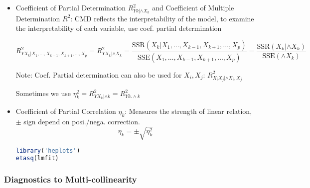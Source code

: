 \begin{itemize}[topsep=2pt,itemsep=2pt]
\item Coefficient of Partial Determination $ R^2_{Yk|\wedge X_k} $ and Coefficient of Multiple Determination $ R^2 $:
    CMD reflects the interpretability of the model, to examine the interpretability of each variable, use coef. partial determination

\begin{equation}
    R^2_{YX_k|X_1,\ldots,X_{k-1},X_{k+1},\ldots,X_p}=R^2_{YX_k|\wedge X_k}=\dfrac{\mathrm{SSR}(X_k|X_1,\ldots,X_{k-1},X_{k+1},\ldots,X_p) }{\mathrm{SSE}(X_1,\ldots,X_{k-1},X_{k+1},\ldots,X_p) }=\dfrac{\mathrm{SSR}(X_k|\wedge X_k) }{\mathrm{SSE}(\wedge X_k) }
\end{equation}

    Note: Coef. Partial determination can also be used for $ X_i,X_j $: $ R^2_{X_iX_j|\wedge X_i,X_j} $

    Sometimes we use $ \eta^2_k=R^2_{YX_k|\wedge k}=R^2_{Yk.\wedge k} $

    \item Coefficient of Partial Correlation $ \eta_k $: Measures the strength of linear relation, $ \pm $ sign depend on posi./nega. correction.
    \begin{equation}
        \eta_k=\pm \sqrt{\eta^2_k} 
    \end{equation}
    
    
\begin{rcode}
\begin{lstlisting}[language=R]
library('heplots')
etasq(lmfit)
\end{lstlisting}

\end{rcode}

\end{itemize}











\subsubsection{Diagnostics to Multi-collinearity}\label{SubSubSectionDiagnosticsToMultiCollinearity}
    
